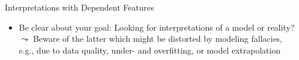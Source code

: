 \documentclass[11pt,compress,t,notes=noshow, aspectratio=169, xcolor=table]{beamer}
\begin{document}
\begin{frame}{Interpretations with Dependent Features}
\begin{itemize}



\pause

\item Be clear about your goal: Looking for interpretations of a model or reality?
\\
$\leadsto$ Beware of the latter which might be distorted by modeling fallacies, \\
e.g., due to data quality, under- and overfitting, or model extrapolation

\end{itemize}
\end{frame}
\end{document}
